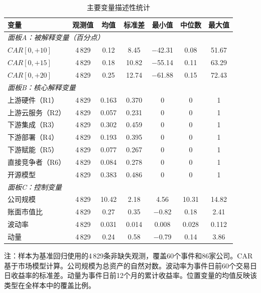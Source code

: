 \documentclass[11pt,fontset=fandol,a4paper]{ctexart}
\begin{document}
\begin{table}[H]
\centering
\small
\begin{threeparttable}
\caption{主要变量描述性统计}
\label{tab:descriptive}
\begin{tabular}{lcccccc}
\toprule
变量 & 观测值 & 均值 & 标准差 & 最小值 & 中位数 & 最大值 \\
\midrule
\multicolumn{7}{l}{\textit{面板A：被解释变量（百分点）}} \\
$CAR[0,+10]$ & 4\,829 & 0.12 & 8.45 & $-$42.31 & 0.08 & 51.67 \\
$CAR[0,+15]$ & 4\,829 & 0.18 & 10.82 & $-$55.14 & 0.11 & 63.29 \\
$CAR[0,+20]$ & 4\,829 & 0.25 & 12.74 & $-$61.88 & 0.15 & 72.43 \\[3pt]
\multicolumn{7}{l}{\textit{面板B：核心解释变量}} \\
上游硬件（R1） & 4\,829 & 0.163 & 0.370 & 0 & 0 & 1 \\
上游云服务（R2） & 4\,829 & 0.057 & 0.231 & 0 & 0 & 1 \\
下游集成（R3） & 4\,829 & 0.302 & 0.459 & 0 & 0 & 1 \\
下游部署（R4） & 4\,829 & 0.193 & 0.395 & 0 & 0 & 1 \\
下游赋能（R5） & 4\,829 & 0.077 & 0.267 & 0 & 0 & 1 \\
直接竞争者（R6） & 4\,829 & 0.084 & 0.278 & 0 & 0 & 1 \\
开源模型 & 4\,829 & 0.383 & 0.486 & 0 & 0 & 1 \\[3pt]
\multicolumn{7}{l}{\textit{面板C：控制变量}} \\
公司规模 & 4\,829 & 10.42 & 2.18 & 4.56 & 10.31 & 14.82 \\
账面市值比 & 4\,829 & 0.27 & 0.35 & $-$0.82 & 0.18 & 2.41 \\
波动率 & 4\,829 & 0.031 & 0.014 & 0.008 & 0.028 & 0.112 \\
动量 & 4\,829 & 0.24 & 0.58 & $-$0.79 & 0.14 & 3.86 \\
\bottomrule
\end{tabular}
\begin{tablenotes}
\footnotesize
\item 注：样本为基准回归使用的4\,829条非缺失观测，覆盖60个事件和86家公司。CAR基于市场模型计算。公司规模为总资产的自然对数。波动率为事件日前60个交易日日收益率的标准差。动量为事件日前12个月的累计收益率。位置变量的均值反映该类型在全样本中的覆盖比例。
\end{tablenotes}
\end{threeparttable}
\end{table}
\end{document}

